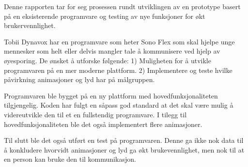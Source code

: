 
Denne rapporten tar for seg prosessen rundt utviklingen av en prototype basert på en eksisterende programvare og testing av nye funksjoner for økt brukervennlighet. 

Tobii Dynavox har en programvare som heter Sono Flex som skal hjelpe unge mennesker som helt eller delvis mangler tale å kommunisere ved hjelp av øyesporing. De ønsket å utforske følgende: 1)  Muligheten for å utvikle programvaren på en mer moderne plattform. 2) Implementere og teste hvilke påvirkning animasjoner og lyd har på målgruppen.

Programvaren ble bygget på en ny plattform med hovedfunksjonaliteten tilgjengelig. Koden har fulgt en såpass god standard at det skal være mulig å videreutvikle den til et en fullstendig programvare. I tilegg til hovedfunksjonaliteten ble det også implementert flere animasjoner. 

Til slutt ble det også utført en test på programvaren. Denne ga ikke nok data til å konkludere hvorvidt animasjoner og lyd ga økt brukevennlighet, men nok til at en person kan bruke den til kommunikasjon.

